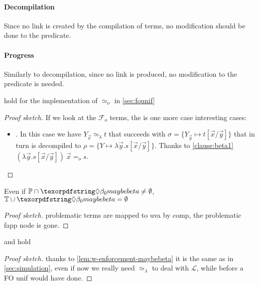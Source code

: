 \documentclass[sigconf,natbib=false,review]{acmart}
\newcommand{\EqualRel}{\ensuremath{=}}
\newcommand{\UnifRel}{\ensuremath{\simeq}}
\newcommand{\Uo}{\texorpdfstring{\ensuremath{\UnifRel_o}\xspace}{unif\_o}}
\newcommand{\Eo}{\ensuremath{\EqualRel_o}\xspace}
\newcommand{\Ue}{\ensuremath{\UnifRel_\lambda}\xspace}
\newcommand{\llambda}{\ensuremath{\mathcal{L}}\xspace}
\newcommand{\Fo}{\texorpdfstring{\ensuremath{\mathcal{F}_{\!o}\xspace}}{Fo}} %
\newcommand{\foUnifPb}{\ensuremath{\mathbb{P}}\xspace}
\newcommand{\hoUnifPb}{\ensuremath{\mathbb{T}}\xspace}
\begin{document}
\paragraph{Decompilation} Since no link is created by the compilation of 
\maybebeta terms, no modification should be done
to the  predicate.

\paragraph{Progress} Similarly to decompilation, since no link is produced,
no modification to the  predicate is needed.

\begin{lemma}
   hold for the implementation of \Uo
  in \cref{sec:founif}
  \end{lemma}
  \begin{proof}[Proof sketch]
  If we look at the \Fo{} terms, the is one more case interesting cases:
  \begin{itemize}
  \item \elpiIn{fapp[fuva X|L] ~\Uo~s}. In this case
   we have $Y_{\vec{x}} \Ue t$ that succeeds with
   $\sigma = \{ Y_{\vec{y}} \mapsto t[\vec{x}/\vec{y}]\}$ that in turn
   is decompiled to $\rho = \{ Y \mapsto \lambda \vec{y}.s[\vec{x}/\vec{y}]\}$.
   Thanks to \ref{clause:beta1}
   $(\lambda \vec{y}.s[\vec{x}/\vec{y}])~\vec{x} \Eo s$.
  \end{itemize}
  \end{proof}
  
\begin{lemma}\label{lem:w-enforcement-maybebeta} Even if $\foUnifPb \cap \maybebeta \ne \emptyset$,
  $\hoUnifPb \cup \maybebeta = \emptyset$
\end{lemma}
\begin{proof}[Proof sketch]
  problematic terms are mapped to uva by comp, the problematic fapp node is gone.
\end{proof}

\begin{theorem}  and
 hold
\end{theorem}
\begin{proof}[Proof sketch] thanks to \cref{lem:w-enforcement-maybebeta}
  it is the same as in \cref{sec:simulation}, even if now
  we really need \Ue{} to deal with \llambda, while before a FO unif
  would have done.
\end{proof}
\end{document}
